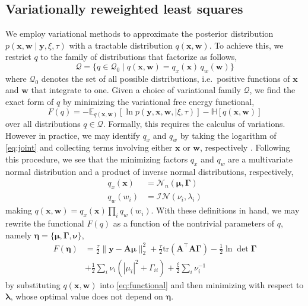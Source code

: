 \documentclass[final,5p,times,twocolumn]{elsarticle}
\newcommand{\m}[1]{\boldsymbol{#1}}
\begin{document}
\subsection{Variationally reweighted least squares}
\label{subsec:vrls}
We employ variational methods \cite{wainwright:ftml2008} to
approximate the posterior distribution
$p(\m{x}, \m{w} \mid \m{y}, \xi, \tau)$ with a tractable distribution
$q(\m{x}, \m{w})$. To achieve this, we restrict $q$ to the family of
distributions that factorize as follows,
\begin{equation}
\label{eq:family}
\mathcal{Q} = \{
 q \in \mathcal{Q}_0 \mid q(\m{x}, \m{w}) = q_x(\m{x}) \, q_w(\m{w})
\}
\end{equation}
where $\mathcal{Q}_0$ denotes the set of all possible distributions,
i.e.~positive functions of $\m{x}$ and $\m{w}$ that integrate to one.
Given a choice of variational family $\mathcal{Q}$, we find the exact
form of $q$ by minimizing the variational free energy functional,
\begin{equation}
\label{eq:functional}
F(q) =
 -\mathbb{E}_{q(\m{x},\m{w})}[\ln p(\m{y}, \m{x}, \m{w}, \mid \xi, \tau)]
 -\mathbb{H}[q(\m{x},\m{w})]
\end{equation}
over all distributions $q \in \mathcal{Q}$. Formally, this requires the
calculus of variations. However in practice, we may identify $q_x$ and
$q_w$ by taking the logarithm of \eqref{eq:joint} and collecting terms
involving either $\m{x}$ or $\m{w}$, respectively \cite{worley:cmr2018}.
Following this procedure, we see that the minimizing factors $q_x$ and
$q_w$ are a multivariate normal distribution and a product of inverse
normal distributions, respectively,
\begin{align}
q_x(\m{x}) &= \mathcal{N}_n(\m{\mu}, \m{\Gamma})
\\
q_w(w_i) &= \mathcal{IN}(\nu_i, \lambda_i)
\end{align}
making $q(\m{x}, \m{w}) = q_x(\m{x}) \prod_i q_w(w_i)$. With these definitions
in hand, we may rewrite the functional $F(q)$ as a function of the nontrivial
parameters of $q$, namely $\m{\eta} = \{ \m{\mu}, \m{\Gamma}, \m{\nu} \}$,
\begin{equation}
\begin{aligned}
\label{eq:objective}
F(\m{\eta}) &=
 \frac{\tau}{2} \| \m{y} - \m{A} \m{\mu} \|_2^2
+\frac{\tau}{2} \mathrm{tr}(\m{A}^\top \m{A} \m{\Gamma})
-\frac{1}{2} \ln\det\m{\Gamma}
\\ &
+\frac{1}{2} {\textstyle\sum}_i \nu_i (|\mu_i|^2 + \Gamma_{ii})
+\frac{\xi}{2} {\textstyle\sum}_i \nu_i^{-1}
\end{aligned}
\end{equation}
by substituting $q(\m{x}, \m{w})$ into \eqref{eq:functional} and then
minimizing with respect to $\m{\lambda}$, whose optimal value does not
depend on $\m{\eta}$.
\end{document}
